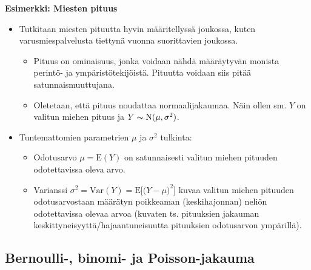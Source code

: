 \documentclass[
]{book}
\providecommand{\tightlist}{%
  \setlength{\itemsep}{0pt}\setlength{\parskip}{0pt}}
\begin{document}
\begin{eblock}{}

\textbf{Esimerkki: Miesten pituus}

\begin{itemize}
\tightlist
\item
  Tutkitaan miesten pituutta hyvin määritellyssä joukossa, kuten varusmiespalvelusta tiettynä vuonna suorittavien joukossa.

  \begin{itemize}
  \tightlist
  \item
    Pituus on ominaisuus, jonka voidaan nähdä määräytyvän monista perintö- ja ympäristötekijöistä. Pituutta voidaan siis pitää satunnaismuuttujana.
  \item
    Oletetaan, että pituus noudattaa normaalijakaumaa. Näin ollen sm. \(Y\) on valitun miehen pituus ja \(Y \thicksim \text{N}(\mu, \sigma^2)\).
  \end{itemize}
\item
  Tuntemattomien parametrien \(\mu\) ja \(\sigma^2\) tulkinta:

  \begin{itemize}
  \tightlist
  \item
    Odotusarvo \(\mu = \text{E}(Y)\) on satunnaisesti valitun miehen pituuden odotettavissa oleva arvo.
  \item
    Varianssi \(\sigma^2 = \mathrm{Var}(Y) = \text{E} \Big[\Big(Y- \mu \Big)^2 \Big]\) kuvaa valitun miehen pituuden odotusarvostaan määrätyn poikkeaman (keskihajonnan) neliön odotettavissa olevaa arvoa (kuvaten ts. pituuksien jakauman keskittyneisyyttä/hajaantuneisuutta pituuksien odotusarvon ympärillä).
  \end{itemize}
\end{itemize}

\end{eblock}

\hfill\break

\hypertarget{bernoulli--binomi--ja-poisson-jakauma}{%
\subsection{Bernoulli-, binomi- ja Poisson-jakauma}\label{bernoulli--binomi--ja-poisson-jakauma}}
\end{document}
